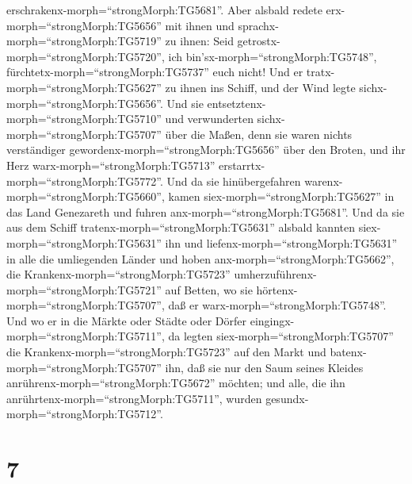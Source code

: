 erschrakenx-morph=``strongMorph:TG5681''. Aber alsbald redete
erx-morph=``strongMorph:TG5656'' mit ihnen und
sprachx-morph=``strongMorph:TG5719'' zu ihnen: Seid
getrostx-morph=``strongMorph:TG5720'', ich
bin'sx-morph=``strongMorph:TG5748'',
fürchtetx-morph=``strongMorph:TG5737'' euch nicht!  Und er
tratx-morph=``strongMorph:TG5627'' zu ihnen ins Schiff, und der Wind
legte sichx-morph=``strongMorph:TG5656''. Und sie
entsetztenx-morph=``strongMorph:TG5710'' und verwunderten
sichx-morph=``strongMorph:TG5707'' über die Maßen,  denn
sie waren nichts verständiger gewordenx-morph=``strongMorph:TG5656''
über den Broten, und ihr Herz warx-morph=``strongMorph:TG5713''
erstarrtx-morph=``strongMorph:TG5772''.  Und da sie
hinübergefahren warenx-morph=``strongMorph:TG5660'', kamen
siex-morph=``strongMorph:TG5627'' in das Land Genezareth und fuhren
anx-morph=``strongMorph:TG5681''.  Und da sie aus dem
Schiff tratenx-morph=``strongMorph:TG5631'' alsbald kannten
siex-morph=``strongMorph:TG5631'' ihn  und
liefenx-morph=``strongMorph:TG5631'' in alle die umliegenden Länder und
hoben anx-morph=``strongMorph:TG5662'', die
Krankenx-morph=``strongMorph:TG5723''
umherzuführenx-morph=``strongMorph:TG5721'' auf Betten, wo sie
hörtenx-morph=``strongMorph:TG5707'', daß er
warx-morph=``strongMorph:TG5748''.  Und wo er in die Märkte
oder Städte oder Dörfer eingingx-morph=``strongMorph:TG5711'', da legten
siex-morph=``strongMorph:TG5707'' die
Krankenx-morph=``strongMorph:TG5723'' auf den Markt und
batenx-morph=``strongMorph:TG5707'' ihn, daß sie nur den Saum seines
Kleides anrührenx-morph=``strongMorph:TG5672'' möchten; und alle, die
ihn anrührtenx-morph=``strongMorph:TG5711'', wurden
gesundx-morph=``strongMorph:TG5712''.

\hypertarget{section-6}{%
\section{7}\label{section-6}}

